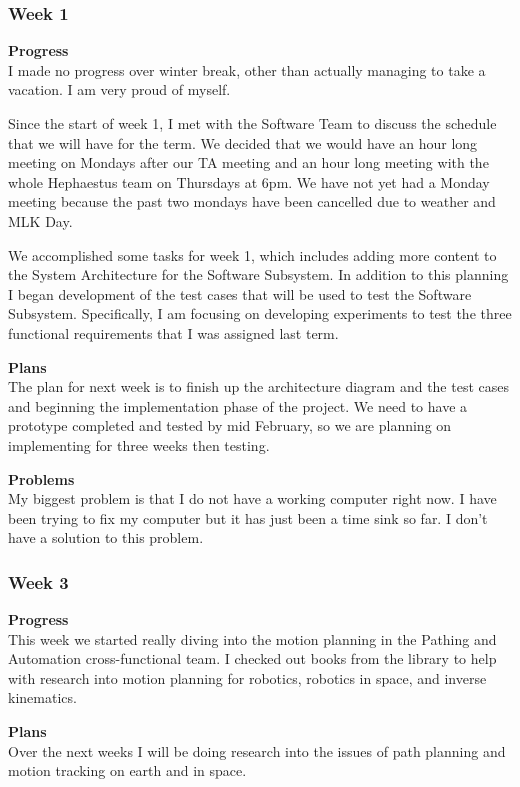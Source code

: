 \subsubsection{Week 1}
\textbf{Progress} \\ 
I made no progress over winter break, other than actually managing to take a vacation. I am very proud of myself.

Since the start of week 1, I met with the Software Team to discuss the schedule that we will have for the term. We decided that we would have an hour long meeting on Mondays after our TA meeting and an hour long meeting with the whole Hephaestus team on Thursdays at 6pm. We have not yet had a Monday meeting because the past two mondays have been cancelled due to weather and MLK Day.

We accomplished some tasks for week 1, which includes adding more content to the System Architecture for the Software Subsystem. In addition to this planning I began development of the test cases that will be used to test the Software Subsystem. Specifically, I am focusing on developing experiments to test the three functional requirements that I was assigned last term.

\textbf{Plans} \\ 
The plan for next week is to finish up the architecture diagram and the test cases and beginning the implementation phase of the project. We need to have a prototype completed and tested by mid February, so we are planning on implementing for three weeks then testing.

\textbf{Problems} \\ 
My biggest problem is that I do not have a working computer right now. I have been trying to fix my computer but it has just been a time sink so far. I don't have a solution to this problem.

\subsubsection{Week 3}
\textbf{Progress} \\ 
This week we started really diving into the motion planning in the Pathing and Automation cross-functional team. I checked out books from the library to help with research into motion planning for robotics, robotics in space, and inverse kinematics.

\textbf{Plans} \\ 
Over the next weeks I will be doing research into the issues of path planning and motion tracking on earth and in space.

